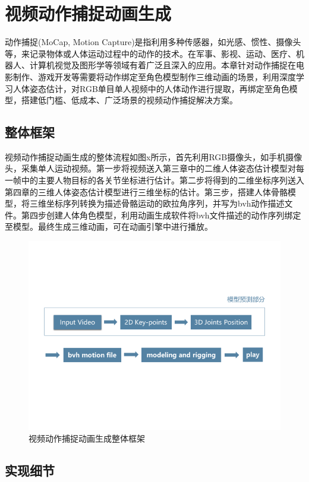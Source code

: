 
\chapter{视频动作捕捉动画生成}
动作捕捉(MoCap, Motion Capture)是指利用多种传感器，如光感、惯性、摄像头等，来记录物体或人体运动过程中的动作的技术。在军事、影视、运动、医疗、机器人、计算机视觉及图形学等领域有着广泛且深入的应用。本章针对动作捕捉在电影制作、游戏开发等需要将动作绑定至角色模型制作三维动画的场景，利用深度学习人体姿态估计，对RGB单目单人视频中的人体动作进行提取，再绑定至角色模型，搭建低门槛、低成本、广泛场景的视频动作捕捉解决方案。

\section{整体框架}

视频动作捕捉动画生成的整体流程如图x所示，首先利用RGB摄像头，如手机摄像头，采集单人运动视频。第一步将视频送入第三章中的二维人体姿态估计模型对每一帧中的主要人物目标的各关节坐标进行估计。第二步将得到的二维坐标序列送入第四章的三维人体姿态估计模型进行三维坐标的估计。第三步，搭建人体骨骼模型，将三维坐标序列转换为描述骨骼运动的欧拉角序列，并写为bvh动作描述文件。第四步创建人体角色模型，利用动画生成软件将bvh文件描述的动作序列绑定至模型。最终生成三维动画，可在动画引擎中进行播放。
\begin{figure}[h]
	\centering
	\includegraphics[scale=0.4]{figures/27.png}
	\caption{视频动作捕捉动画生成整体框架}
	\label{fig:f27}
\end{figure}

\section{实现细节}
